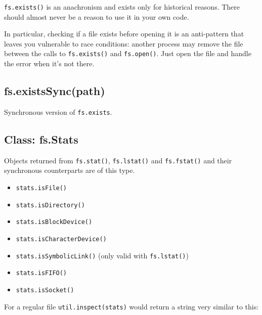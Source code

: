 \texttt{fs.exists()} is an anachronism and exists only for historical
reasons. There should almost never be a reason to use it in your own
code.

In particular, checking if a file exists before opening it is an
anti-pattern that leaves you vulnerable to race conditions: another
process may remove the file between the calls to \texttt{fs.exists()}
and \texttt{fs.open()}. Just open the file and handle the error when
it's not there.

\subsection{fs.existsSync(path)}\label{fs.existssyncpath}

Synchronous version of \texttt{fs.exists}.

\subsection{Class: fs.Stats}\label{class-fs.stats}

Objects returned from \texttt{fs.stat()}, \texttt{fs.lstat()} and
\texttt{fs.fstat()} and their synchronous counterparts are of this type.

\begin{itemize}
\itemsep1pt\parskip0pt
\item
  \texttt{stats.isFile()}
\item
  \texttt{stats.isDirectory()}
\item
  \texttt{stats.isBlockDevice()}
\item
  \texttt{stats.isCharacterDevice()}
\item
  \texttt{stats.isSymbolicLink()} (only valid with \texttt{fs.lstat()})
\item
  \texttt{stats.isFIFO()}
\item
  \texttt{stats.isSocket()}
\end{itemize}

For a regular file \texttt{util.inspect(stats)} would return a string
very similar to this:

